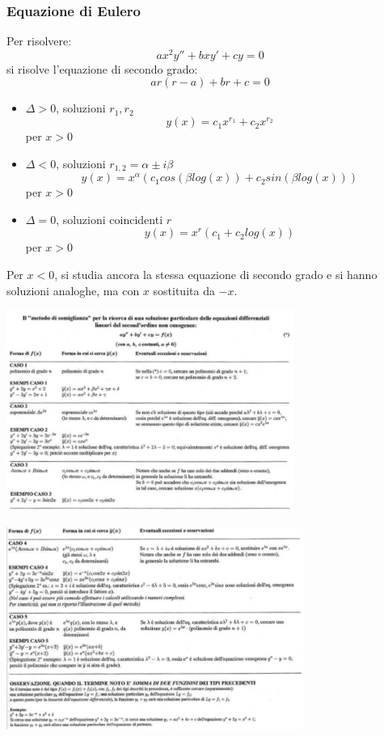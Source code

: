 \subsubsection{Equazione di Eulero}
Per risolvere:
\[
    ax^2y''+bxy'+cy= 0
\]
si risolve l'equazione di secondo grado:
\[
    ar(r-a)+br+c = 0
\]
\begin{itemize}
    \item $\Delta >0$, soluzioni $r_1, r_2$
    \[
        y(x) =c_1x^{r_1}+c_2x^{r_2}
    \]
    per $x>0$
    \item $\Delta <0$, soluzioni $r_{1,2} = \alpha \pm i \beta$
    \[
        y(x) = x^{\alpha}(c_1 cos(\beta log(x)) + c_2 sin(\beta log(x)))
    \]
    per $x>0$
    \item $\Delta = 0$, soluzioni coincidenti $r$
    \[
        y(x) = x^r(c_1 + c_2log(x))
    \]
    per $x>0$
\end{itemize}
Per $x<0$, si studia ancora la stessa equazione di secondo grado e si hanno soluzioni analoghe, ma con $x$ sostituita da $-x$.\newline
\begin{center}
    \includegraphics[height=250px]{../img/eqdiff2.PNG}
\end{center}
\begin{center}
    \includegraphics[height=250px]{../img/eqdiff2(1).PNG}
\end{center}